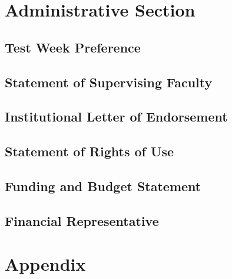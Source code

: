 \documentclass{article}
\begin{document}
\section{Administrative Section}
\subsection{Test Week Preference}
\subsection{Statement of Supervising Faculty}
\subsection{Institutional Letter of Endorsement}
\subsection{Statement of Rights of Use}
\subsection{Funding and Budget Statement}
\subsection{Financial Representative}

\section{Appendix}
\end{document}

